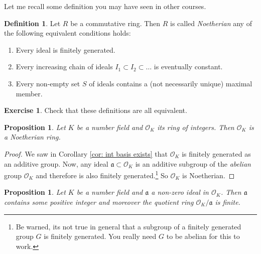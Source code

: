 \documentclass[11pt,a4paper]{report}
\theoremstyle{plain}
\newtheorem{prop}[subsection]{Proposition}
\theoremstyle{definition}
\newtheorem{definition}[subsection]{Definition}
\theoremstyle{definition}
\newtheorem{rmrk}[subsection]{Remark}
\newtheorem{question}[subsection]{Exercise}
\def \OO {\mathcal{O}}
\def\gotha{\mathfrak{a}}
\begin{document}
	
	Let me recall some definition you may have seen in other courses.
	
	\begin{definition}\label{definition: noeth ring}
		Let $R$ be a commutative ring. Then $R$ is called \textit{Noetherian} any of the following equivalent conditions holds:
		
		\begin{enumerate}
			\item 	 Every ideal is finitely generated.
			\item Every increasing chain of ideals $I_1 \subset I_2 \subset \dots$ is eventually constant.
			\item Every non-empty set $S$ of ideals contains a (not necessarily unique) maximal member.	
		\end{enumerate}
		
	\end{definition}
	
	\begin{question}
		Check that these definitions are all equivalent.
	\end{question}
	
	
	\begin{prop}\label{prop: ring of ints is noeth}
		Let $K$ be a number field and $\OO_K$ its ring of integers. Then $\OO_K$ is a Noetherian ring.
	\end{prop}
	
	\begin{proof}
		We saw in Corollary \ref{cor: int basis exists} that $\OO_K$ is finitely generated as an additive group. Now, any ideal $\gotha \subset \OO_K$ is an additive subgroup of the \textit{abelian} group $\OO_K$ and therefore is also finitely generated.\footnote{Be warned, its not true in general that a subgroup of a finitely generated group $G$ is finitely generated. You really need $G$ to be abelian for this to work.} So $\OO_K$ is Noetherian.
	\end{proof}
	
	
	
	
	
	\begin{prop}\label{prop: quot of ideal is finite}
		Let $K$ be a number field and $\gotha$ a non-zero ideal in $\OO_K$. Then $\gotha$ contains some positive integer and moreover the quotient ring $\OO_K /\gotha$ is finite.
	\end{prop}
	
\end{document}
